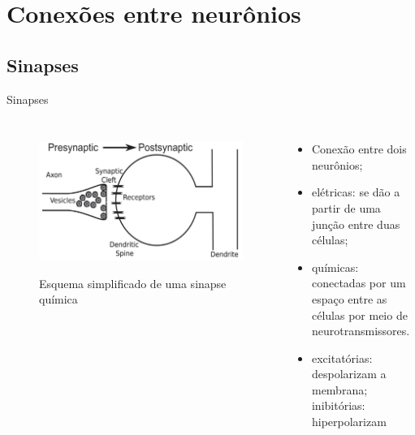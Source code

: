 \section{Conexões entre neurônios}
\subsection{Sinapses}
\begin{frame}{Sinapses}
	\begin{columns}[t]
		\column{5cm}
			\begin{figure}[tb]
				\centering
				\caption{Esquema simplificado de uma sinapse química}
				\label{fig:sinapses}
				\includegraphics[width=0.9\linewidth]{figs/sinapses}\\
			\end{figure}
		\column{5cm}
			\begin{itemize}
				\item Conexão entre dois neurônios;
				\item elétricas: se dão a partir de uma junção entre duas células;
				\item químicas: conectadas por um espaço entre as células por meio de neurotransmissores.
				\item excitatórias: despolarizam a membrana; inibitórias: hiperpolarizam
			\end{itemize}
	\end{columns}
\end{frame}

